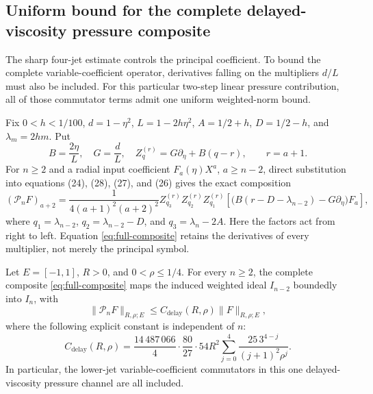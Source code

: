 \subsection{Uniform bound for the complete delayed-viscosity pressure composite}
\label{subsec:full-delayed-composite}

The sharp four-jet estimate controls the principal coefficient. To bound the
complete variable-coefficient operator, derivatives falling on the
multipliers $d/L$ must also be included. For this particular two-step
linear pressure contribution, all of those commutator terms admit one
uniform weighted-norm bound.

Fix $0<h<1/100$, $d=1-\eta^2$, $L=1-2h\eta^2$,
$A=1/2+h$, $D=1/2-h$, and $\lambda_m=2hm$. Put
\[
 B=\frac{2\eta}{L},\quad G=\frac{d}{L},\quad
 Z_q^{(r)}=G\partial_\eta+B(q-r),\qquad r=a+1.
\]
For $n\ge2$ and a radial input coefficient $F_a(\eta)X^a$,
$a\ge n-2$, direct substitution into equations (24), (28), (27),
and (26) gives the exact composition
\begin{equation}\label{eq:full-composite}
 (\mathcal P_nF)_{a+2}
 =\frac{1}{4(a+1)^2(a+2)^2}
 Z_{q_3}^{(r)}Z_{q_2}^{(r)}Z_{q_1}^{(r)}
 \left[\bigl(B(r-D-\lambda_{n-2})-G\partial_\eta\bigr)F_a\right],
\end{equation}
where $q_1=\lambda_{n-2}$, $q_2=\lambda_{n-2}-D$,
and $q_3=\lambda_n-2A$. Here the factors act from right to left.
Equation \eqref{eq:full-composite} retains the derivatives of
every multiplier, not merely the principal symbol.

\begin{theorem}
\label{thm:delayed-banach}
Let $E=[-1,1]$, $R>0$, and $0<\rho\le1/4$. For every
$n\ge2$, the complete composite \eqref{eq:full-composite}
maps the induced weighted ideal $I_{n-2}$ boundedly into $I_n$,
with
\begin{equation}\label{eq:full-delayed-bound}
 \|\mathcal P_n F\|_{R,\rho;E}
 \le C_{\mathrm{delay}}(R,\rho)\|F\|_{R,\rho;E},
\end{equation}
where the following explicit constant is independent of $n$:
\begin{equation}\label{eq:full-delayed-constant}
 C_{\mathrm{delay}}(R,\rho)=
 \frac{14\,487\,066}{4}\cdot\frac{80}{27}\cdot54R^2
 \sum_{j=0}^{4}\frac{25\,3^{4-j}}{(j+1)^2\rho^j}.
\end{equation}
In particular, the lower-jet variable-coefficient commutators
in this one delayed-viscosity pressure channel are all included.
\end{theorem}

